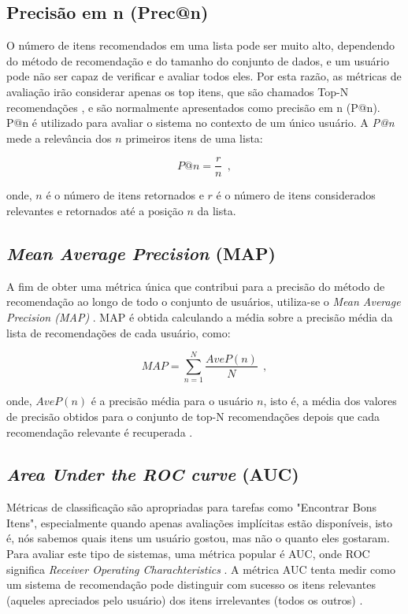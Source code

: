 \subsection{Precisão em n (Prec@n)}

O número de itens recomendados em uma lista pode ser muito alto, dependendo do método de recomendação e do tamanho do conjunto de dados, e um usuário pode não ser capaz de verificar e avaliar todos eles. Por esta razão, as métricas de avaliação irão considerar apenas os top itens, que são chamados Top-N recomendações \citep{Deshpande:2004:ITN:963770.963776}, e são normalmente apresentados como precisão em n (P@n). P@n é utilizado para avaliar o sistema no contexto de um único usuário. A \textit{P@n} mede a relevância dos $n$ primeiros itens de uma lista:

\begin{equation}
P@n = \frac{r}{n}~~,
\end{equation}

onde, $n$ é o número de itens retornados e $r$ é o número de itens considerados relevantes e retornados até a posição $n$ da lista.

\subsection{\textit{Mean Average Precision} (MAP)}
A fim de obter uma métrica única que contribui para a precisão do método de recomendação ao longo de todo o conjunto de usuários, utiliza-se o \textit{Mean Average Precision (MAP)} \citep{parra2013}. \ac{MAP} é obtida calculando a média sobre a precisão média da lista de recomendações de cada usuário, como:

\begin{equation}
MAP = \sum_{n=1}^{N}\frac{AveP(n)}{N}~~,
\end{equation}

onde, $AveP(n)$ é a precisão média para o usuário $n$, isto é, a média dos valores de precisão obtidos para o conjunto de top-N recomendações depois que cada recomendação relevante é recuperada \citep{Manning:2008:IIR:1394399}.

\subsection{\textit{Area Under the ROC curve} (AUC)}

Métricas de classificação são apropriadas para tarefas como "Encontrar Bons Itens", especialmente quando apenas avaliações implícitas estão disponíveis, isto é, nós sabemos quais itens um usuário gostou, mas não o quanto eles gostaram. Para avaliar este tipo de sistemas, uma métrica popular é \ac{AUC}, onde ROC significa \textit{Receiver Operating Charachteristics} \citep{hanley1982mau}. A métrica \ac{AUC} tenta medir como um sistema de recomendação pode distinguir com sucesso os itens relevantes (aqueles apreciados pelo usuário) dos itens irrelevantes (todos os outros) \citep{DBLP:journals/corr/abs-1202-1112}.

